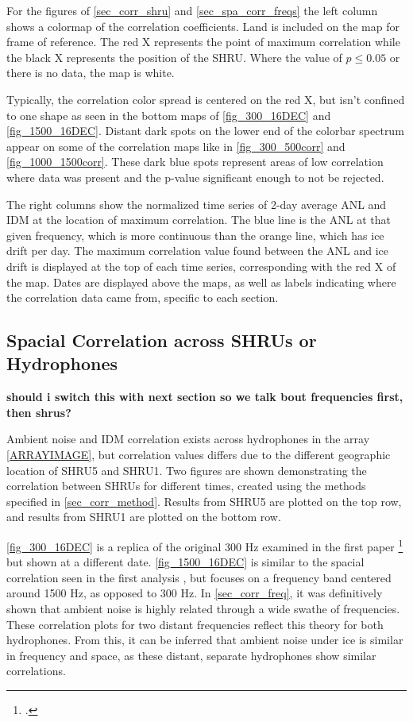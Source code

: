 For the figures of \autoref{sec_corr_shru} and \autoref{sec_spa_corr_freqs} the left column shows a colormap of the correlation coefficients. Land is included on the map for frame of reference. The red X represents the point of maximum correlation while the black X represents the position of the SHRU. Where the value of $p\leq0.05$ or there is no data, the map is white. 

Typically, the correlation color spread is centered on the red X, but isn't confined to one shape as seen in the bottom maps of \autoref{fig_300_16DEC} and \autoref{fig_1500_16DEC}. Distant dark spots on the lower end of the colorbar spectrum appear on some of the correlation maps like in \autoref{fig_300_500corr} and \autoref{fig_1000_1500corr}. These dark blue spots represent areas of low correlation where data was present and the p-value significant enough to not be rejected.

The right columns show the normalized time series of 2-day average ANL and IDM at the location of maximum correlation. The blue line is the ANL at that given frequency, which is more continuous than the orange line, which has ice drift per day. The maximum correlation value found between the ANL and ice drift is displayed at the top of each time series, corresponding with the red X of the map. Dates are displayed above the maps, as well as labels indicating where the correlation data came from, specific to each section.


\subsection{Spacial Correlation across \textbf{SHRUs or Hydrophones}} \label{sec_corr_shru}

\textbf{should i switch this with next section so we talk bout frequencies first, then shrus?}

Ambient noise and IDM correlation exists across hydrophones in the array \autoref{ARRAYIMAGE}, but correlation values differs due to the different geographic location of SHRU5 and SHRU1. Two figures are shown demonstrating the correlation between SHRUs for different times, created using the methods specified in \autoref{sec_corr_method}. Results from SHRU5 are plotted on the top row, and results from SHRU1 are plotted on the bottom row. 

\autoref{fig_300_16DEC} is a replica of the original 300 Hz examined in the first paper \footcite[]{Bonnel2021} but shown at a different date. \autoref{fig_1500_16DEC} is similar to the spacial correlation seen in the first analysis , but focuses on a frequency band centered around 1500 Hz, as opposed to 300 Hz. In \autoref{sec_corr_freq}, it was definitively shown that ambient noise is highly related through a wide swathe of frequencies. These correlation plots for two distant frequencies reflect this theory for both hydrophones. From this, it can be inferred that ambient noise under ice is similar in frequency and space, as these distant, separate hydrophones show similar correlations.   %

